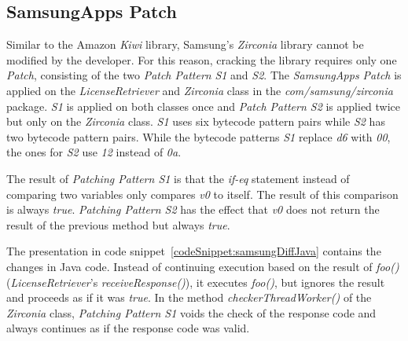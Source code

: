 \subsection{SamsungApps Patch}
Similar to the Amazon \textit{Kiwi} library, Samsung's \textit{Zirconia} library cannot be modified by the developer.
For this reason, cracking the library requires only one \textit{Patch}, consisting of the two \textit{Patch Pattern} \textit{S1} and \textit{S2}.
The \textit{SamsungApps Patch} is applied on the \textit{LicenseRetriever} and \textit{Zirconia} class in the \textit{com/samsung/zirconia} package.
\textit{S1} is applied on both classes once and \textit{Patch Pattern S2} is applied twice but only on the \textit{Zirconia} class.
\newline
\textit{S1} uses six bytecode pattern pairs while \textit{S2} has two bytecode pattern pairs.
While the bytecode patterns \textit{S1} replace \textit{d6} with \textit{00}, the ones for \textit{S2} use \textit{12} instead of \textit{0a}.
\newpage


The result of \textit{Patching Pattern S1} is that the \textit{if-eq} statement instead of comparing two variables only compares \textit{v0} to itself.
The result of this comparison is always \textit{true}.
\newline
\textit{Patching Pattern S2} has the effect that \textit{v0} does not return the result of the previous method but always \textit{true}.
\newpage

The presentation in code snippet~\ref{codeSnippet:samsungDiffJava} contains the changes in Java code.
Instead of continuing execution based on the result of \textit{foo()} (\textit{LicenseRetriever}'s \textit{receiveResponse()}), it executes \textit{foo()}, but ignores the result and proceeds as if it was \textit{true}.
In the method \textit{checkerThreadWorker()} of the \textit{Zirconia} class, \textit{Patching Pattern S1} voids the check of the response code and always continues as if the response code was valid.
